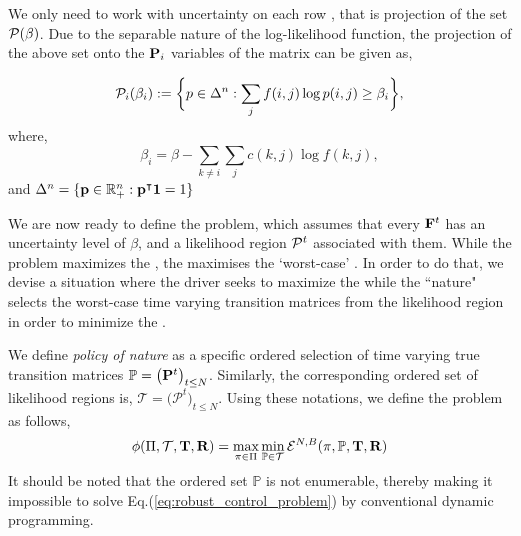 We only need to work with uncertainty on each row {\truetransitionmatrix}, that is projection of the set $\mathcal{P}(\beta)$. Due to the separable nature of the log-likelihood function, the projection of the above set onto the ${\mathbf{P}}_i$ variables of the matrix {\truetransitionmatrix} can be given as,

\begin{equation*}
\mathcal{P}_i(\beta_i) := \bigg\{p \in \Delta^n : \sum_{j}f(i,j)\log{p(i,j)} \geq \beta_i \bigg\},
\end{equation*}
where,
\begin{equation*}
\beta_i = \beta - \sum_{k \neq i}\sum_{j}c(k,j)\log{f(k,j)},
\end{equation*}
and  $\Delta^n = \{\mathbf{p} \in \mathbb{R}^n_+ : \mathbf{p}^\intercal \mathbf{1} = 1 \}$

 We are now ready to define the {\robustproblem}
problem, which assumes that every ${{\mathbf{F}}}^t$ has an uncertainty level of $\beta$, and a likelihood region $\mathcal{P}^t$ associated with them. While the {\originalproblem} problem maximizes the {\totalexpectedearnings}, the {\nominalproblem} maximises the `worst-case' {\totalexpectedearnings}. In order to do that, we devise a situation where the driver seeks to maximize the {\totalexpectedearnings} 
while the ``nature" selects the worst-case time varying transition matrices from the likelihood region {\likelihoodregion} in order to minimize the {\totalexpectedearnings}.

We define \textit{policy of nature} as a specific ordered selection of time varying true transition matrices 
$\mathbb{P} = \big( {\mathbf{P}}^t \big)_{t \leq N}$.
Similarly, the corresponding ordered set of likelihood regions is,
$\mathcal{T} = \big(\mathcal{P}^t \big)_{t \leq N}$. 
Using these notations, we define the {\robustproblem} problem as follows,
\begin{equation}
\label{eq:robust_control_problem}
\phi(\Pi, \mathcal{T}, {\mathbf{T}}, {\mathbf{R}}) = \max_{\pi \in \Pi} \min_{\mathbb{P} \in \mathcal{T}} \mathcal{E}^{N,B}(\pi, \mathbb{P}, {\mathbf{T}}, {\mathbf{R}}) \\
\end{equation}
It should be noted that the ordered set $\mathbb{P}$ is not enumerable, thereby making it impossible to solve Eq.(\ref{eq:robust_control_problem}) by conventional dynamic programming.

